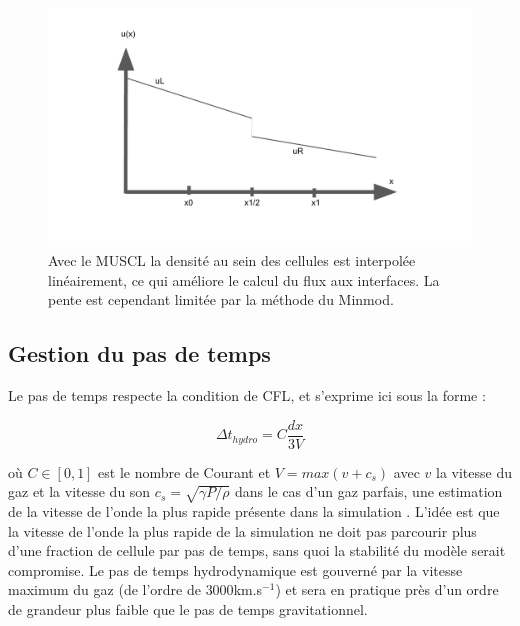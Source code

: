 \begin{figure}
        \includegraphics[width=.95\linewidth]{img/02/MUSCL_minmod.pdf} 
        \caption[Méthode MUSCL]{Avec le \ac{MUSCL} la densité au sein des cellules est interpolée linéairement, ce qui améliore le calcul du flux aux interfaces.
        La pente est cependant limitée par la méthode du Minmod.
 		\label{fig:MUSCL}
 		}
\end{figure}



\subsection{Gestion du pas de temps}
\label{sec:dthydro}

Le pas de temps respecte la condition de \ac{CFL}, et s'exprime ici sous la forme :

\begin{equation}
\Delta t_{hydro} = C \frac{dx}{3V}
\end{equation}

où $C \in [0,1] $ est le nombre de Courant et $V = max(v + c_s)$ avec $v$ la vitesse du gaz et la vitesse du son $c_s = \sqrt{\gamma P/\rho}$ dans le cas d'un gaz parfais, une estimation de la vitesse de l'onde la plus rapide présente dans la simulation \citep{toro1999riemann}.
L'idée est que la vitesse de l'onde la plus rapide de la simulation ne doit pas parcourir plus d'une fraction de cellule par pas de temps, sans quoi la stabilité du modèle serait compromise.
Le pas de temps hydrodynamique est gouverné par la vitesse maximum du gaz (de l'ordre de $3000$km.s$^{-1}$) et sera en pratique près d'un ordre de grandeur plus faible que le pas de temps gravitationnel.



